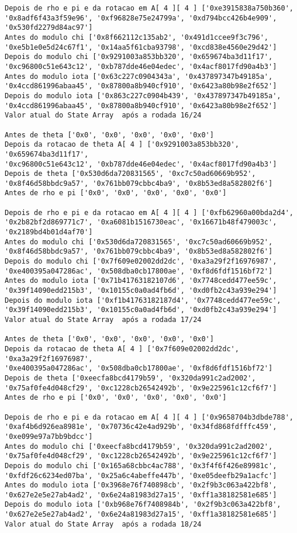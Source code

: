 \documentclass[12pt, a4paper]{article}
\begin{document}
\begin{enumerate}
\begin{enumerate}
\begin{verbatim}
Depois de rho e pi e da rotacao em A[ 4 ][ 4 ] ['0xe3915838a750b360',
'0x8adf6f43a3f59e96', '0xf96828e75e24799a', '0xd794bcc426b4e909',
'0x530fd2279d84ac97']
Antes do modulo chi ['0x8f662112c135ab2', '0x491d1ccee9f3c796',
'0xe5b1e0e5d24c67f1', '0x14aa5f61cba93798', '0xcd838e4560e29d42']
Depois do modulo chi ['0x9291003a853bb320', '0x659674ba3d11f17',
'0xc96800c51e643c12', '0xb787dde46e04edec', '0x4acf8017fd90a4b3']
Antes do modulo iota ['0x63c227c0904343a', '0x437897347b49185a',
'0x4ccd861996abaa45', '0x87800a8b940cf910', '0x6423a80b98e2f652']
Depois do modulo iota ['0x863c227c0904b439', '0x437897347b49185a',
'0x4ccd861996abaa45', '0x87800a8b940cf910', '0x6423a80b98e2f652']
Valor atual do State Array  após a rodada 16/24

Antes de theta ['0x0', '0x0', '0x0', '0x0', '0x0']
Depois da rotacao de theta A[ 4 ] ['0x9291003a853bb320', '0x659674ba3d11f17',
'0xc96800c51e643c12', '0xb787dde46e04edec', '0x4acf8017fd90a4b3']
Depois de theta ['0x530d6da720831565', '0xc7c50ad60669b952',
'0x8f46d58bbdc9a57', '0x761bb079cbbc4ba9', '0x8b53ed8a582802f6']
Antes de rho e pi ['0x0', '0x0', '0x0', '0x0', '0x0']

Depois de rho e pi e da rotacao em A[ 4 ][ 4 ] ['0xfb62960a00bda2d4',
'0x2b82bf2d869771c7', '0xa6081b1516730eac', '0x16671b48f479003c',
'0x2189bd4b01d4af70']
Antes do modulo chi ['0x530d6da720831565', '0xc7c50ad60669b952',
'0x8f46d58bbdc9a57', '0x761bb079cbbc4ba9', '0x8b53ed8a582802f6']
Depois do modulo chi ['0x7f609e02002dd2dc', '0xa3a29f2f16976987',
'0xe400395a047286ac', '0x508dba0cb17800ae', '0xf8d6fdf1516bf72']
Antes do modulo iota ['0x71b41763182107d6', '0x7748cedd477ee59c',
'0x39f14090edd215b3', '0x10155c0a0ad4fb6d', '0xd0fb2c43a939e294']
Depois do modulo iota ['0xf1b41763182187d4', '0x7748cedd477ee59c',
'0x39f14090edd215b3', '0x10155c0a0ad4fb6d', '0xd0fb2c43a939e294']
Valor atual do State Array  após a rodada 17/24

Antes de theta ['0x0', '0x0', '0x0', '0x0', '0x0']
Depois da rotacao de theta A[ 4 ] ['0x7f609e02002dd2dc', '0xa3a29f2f16976987',
'0xe400395a047286ac', '0x508dba0cb17800ae', '0xf8d6fdf1516bf72']
Depois de theta ['0xeecfa8bcd4179b59', '0x320da991c2ad2002',
'0x75af0fe4d048cf29', '0xc1228cb26542492b', '0x9e225961c12cf6f7']
Antes de rho e pi ['0x0', '0x0', '0x0', '0x0', '0x0']

Depois de rho e pi e da rotacao em A[ 4 ][ 4 ] ['0x9658704b3dbde788',
'0xaf4b6d926ea8981e', '0x70736c42e4ad929b', '0x34fd868fdfffc459',
'0xe099e97a7bb9bdcc']
Antes do modulo chi ['0xeecfa8bcd4179b59', '0x320da991c2ad2002',
'0x75af0fe4d048cf29', '0xc1228cb26542492b', '0x9e225961c12cf6f7']
Depois do modulo chi ['0x165a68cbbc4ac788', '0x3f4f6f426e89981c',
'0xfdf26c6234ed07ba', '0x25a6c4abeffe447b', '0xe05deefb29a1acfc']
Antes do modulo iota ['0x3968e76f740898cb', '0x2f9b3c063a422bf8',
'0x627e2e5e27ab4ad2', '0x6e24a81983d27a15', '0xff1a38182581e685']
Depois do modulo iota ['0xb968e76f7408984b', '0x2f9b3c063a422bf8',
'0x627e2e5e27ab4ad2', '0x6e24a81983d27a15', '0xff1a38182581e685']
Valor atual do State Array  após a rodada 18/24


\end{verbatim}
\end{enumerate}
\end{enumerate}
\end{document}
